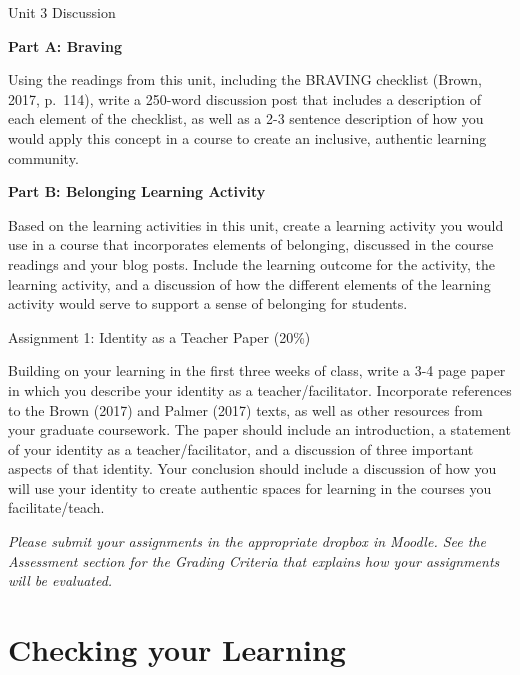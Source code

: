 \documentclass[
]{book}
\begin{document}
\begin{assessment}
{Unit 3 Discussion}

\textbf{Part A: Braving}

Using the readings from this unit, including the BRAVING checklist
(Brown, 2017, p.~114), write a 250-word discussion post that includes a
description of each element of the checklist, as well as a 2-3 sentence
description of how you would apply this concept in a course to create an
inclusive, authentic learning community.

\textbf{Part B: Belonging Learning Activity}

Based on the learning activities in this unit, create a learning
activity you would use in a course that incorporates elements of
belonging, discussed in the course readings and your blog posts. Include
the learning outcome for the activity, the learning activity, and a
discussion of how the different elements of the learning activity would
serve to support a sense of belonging for students.
\end{assessment}

\begin{assessment}
{Assignment 1: Identity as a Teacher Paper (20\%)}

Building on your learning in the first three weeks of class, write a 3-4
page paper in which you describe your identity as a teacher/facilitator.
Incorporate references to the Brown (2017) and Palmer (2017) texts, as
well as other resources from your graduate coursework. The paper should
include an introduction, a statement of your identity as a
teacher/facilitator, and a discussion of three important aspects of that
identity. Your conclusion should include a discussion of how you will
use your identity to create authentic spaces for learning in the courses
you facilitate/teach.
\end{assessment}

\begin{caution}
\emph{Please submit your assignments in the appropriate dropbox in
Moodle. See the Assessment section for the Grading Criteria that
explains how your assignments will be evaluated.}
\end{caution}

\hypertarget{checking-your-learning-2}{%
\section*{Checking your Learning}\label{checking-your-learning-2}}
\end{document}
